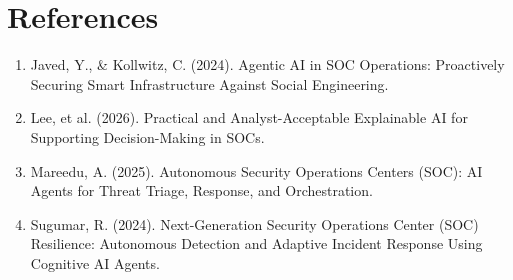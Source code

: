 \documentclass[12pt,a4paper]{report}
\begin{document}
\chapter*{References}

\begin{enumerate}[label={},leftmargin=*]
	
	\item Javed, Y., \& Kollwitz, C. (2024). Agentic AI in SOC Operations: Proactively Securing Smart Infrastructure Against Social Engineering.
	
	\item Lee, et al. (2026). Practical and Analyst-Acceptable Explainable AI for Supporting Decision-Making in SOCs.
	
	\item Mareedu, A. (2025). Autonomous Security Operations Centers (SOC): AI Agents for Threat Triage, Response, and Orchestration.
	
	\item Sugumar, R. (2024). Next-Generation Security Operations Center (SOC) Resilience: Autonomous Detection and Adaptive Incident Response Using Cognitive AI Agents.
	
\end{enumerate}
\end{document}
